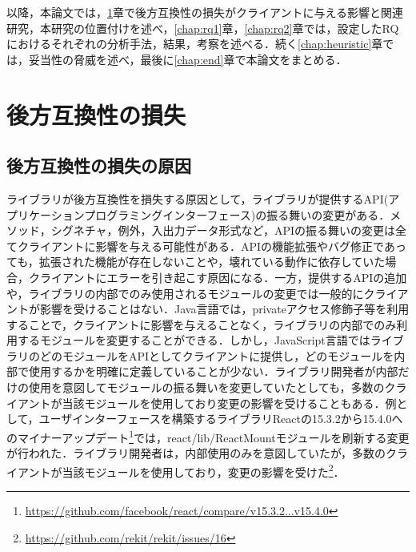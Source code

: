 \documentclass[11pt,dvipdfmx]{jreport}
\begin{document}
以降，本論文では，\ref{chap:backward-compatibility}章で後方互換性の損失がクライアントに与える影響と関連研究，本研究の位置付けを述べ，\ref{chap:rq1}章，\ref{chap:rq2}章では，設定したRQにおけるそれぞれの分析手法，結果，考察を述べる．続く\ref{chap:heuristic}章では，妥当性の脅威を述べ，最後に\ref{chap:end}章で本論文をまとめる．

\chapter{後方互換性の損失}\label{chap:backward-compatibility}

\section{後方互換性の損失の原因}
ライブラリが後方互換性を損失する原因として，ライブラリが提供するAPI(アプリケーションプログラミングインターフェース)の振る舞いの変更がある．メソッド，シグネチャ，例外，入出力データ形式など，APIの振る舞いの変更は全てクライアントに影響を与える可能性がある．APIの機能拡張やバグ修正であっても，拡張された機能が存在しないことや，壊れている動作に依存していた場合，クライアントにエラーを引き起こす原因になる．一方，提供するAPIの追加や，ライブラリの内部でのみ使用されるモジュールの変更では一般的にクライアントが影響を受けることはない．Java言語では，privateアクセス修飾子等を利用することで，クライアントに影響を与えることなく，ライブラリの内部でのみ利用するモジュールを変更することができる．しかし，JavaScript言語ではライブラリのどのモジュールをAPIとしてクライアントに提供し，どのモジュールを内部で使用するかを明確に定義していることが少ない．ライブラリ開発者が内部だけの使用を意図してモジュールの振る舞いを変更していたとしても，多数のクライアントが当該モジュールを使用しており変更の影響を受けることもある．例として，ユーザインターフェースを構築するライブラリReactの15.3.2から15.4.0へのマイナーアップデート\footnote{\url{https://github.com/facebook/react/compare/v15.3.2...v15.4.0}}では，react/lib/ReactMountモジュールを刷新する変更が行われた．ライブラリ開発者は，内部使用のみを意図していたが，多数のクライアントが当該モジュールを使用しており，変更の影響を受けた\footnote{\url{https://github.com/rekit/rekit/issues/16}}．
\end{document}
